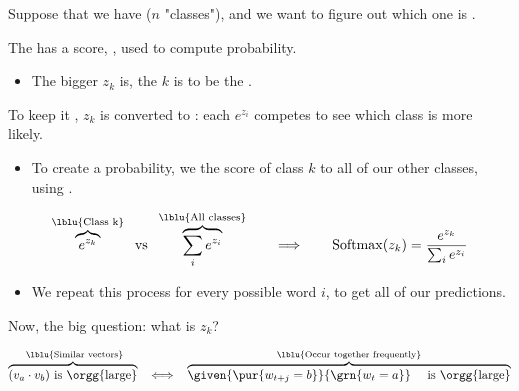         \begin{concept}
            Suppose that we have  ($n$ "classes"), and we want to figure out which one is .
            
            The  has a score, , used to compute probability.

            \begin{itemize}
                \item The bigger $z_k$ is, the  $k$ is to be the .
            \end{itemize}

            \phantom{}

            To keep it , $z_k$ is converted to : each $e^{z_i}$ competes to see which class is more likely.

            \begin{itemize}
                \item To create a probability, we  the score of class $k$ to all of our other classes, using .
            \end{itemize}

            \begin{equation*}
                \overbrace{
                    e^{z_k}}^{\text{\lblu{Class k}}} 
                \text{\; vs \;} 
                \overbrace{ 
                    \sum_i e^{z_i} }^{\text{\lblu{All classes}}}
                \quad \quad \Longrightarrow \quad \quad  \operatorname{Softmax}(z_k) = \frac{e^{z_k}}{ \sum_i e^{z_i}}
            \end{equation*}
            
        \end{concept}

        \begin{itemize}
            \item We repeat this process for every possible word $i$, to get all of our predictions.
        \end{itemize}

        Now, the big question: what is $z_k$?

        \begin{equation*}
            \overbrace{ 
                (v_a \cdot v_b) \text{ is \orgg{large}}
            }^{\text{ \lblu{Similar vectors}}}
            \;\;\iff\;\; 
            \overbrace{
                \given{ \pur{w_{t+j} = b} }{ \grn{w_t=a} } \text{ \quad is \orgg{large}}}
            ^{\text{\lblu{Occur together frequently}}}
        \end{equation*}

